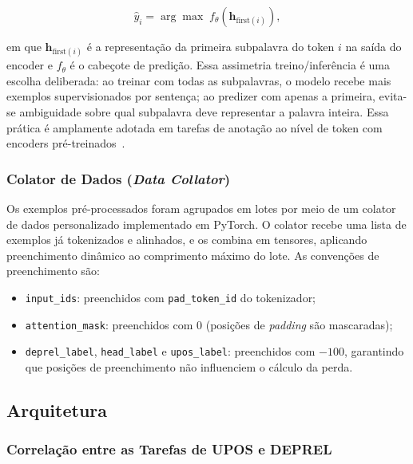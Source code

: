 \[
\hat{y}_i = \arg\max \; f_\theta\!\left(\mathbf{h}_{\mathrm{first}(i)}\right),
\]

em que $\mathbf{h}_{\mathrm{first}(i)}$ é a representação da primeira subpalavra do token
$i$ na saída do encoder e $f_\theta$ é o cabeçote de predição. Essa assimetria treino/inferência
é uma escolha deliberada: ao treinar com todas as subpalavras, o modelo recebe mais exemplos
supervisionados por sentença; ao predizer com apenas a primeira, evita-se ambiguidade sobre
qual subpalavra deve representar a palavra inteira. Essa prática é amplamente adotada em
tarefas de anotação ao nível de token com encoders pré-treinados~\citep{devlin2019bert}.

\subsubsection*{Colator de Dados (\textit{Data Collator})}

Os exemplos pré-processados foram agrupados em lotes por meio de um colator de dados
personalizado implementado em PyTorch. O colator recebe uma lista de exemplos já
tokenizados e alinhados, e os combina em tensores, aplicando preenchimento dinâmico ao
comprimento máximo do lote. As convenções de preenchimento são:

\begin{itemize}
    \item \texttt{input\_ids}: preenchidos com \texttt{pad\_token\_id} do tokenizador;
    \item \texttt{attention\_mask}: preenchidos com 0 (posições de \textit{padding} são
          mascaradas);
    \item \texttt{deprel\_label}, \texttt{head\_label} e \texttt{upos\_label}: preenchidos
          com $-100$, garantindo que posições de preenchimento não influenciem o cálculo
          da perda.
\end{itemize}

\subsection*{Arquitetura}

\subsubsection*{Correlação entre as Tarefas de UPOS e DEPREL}

